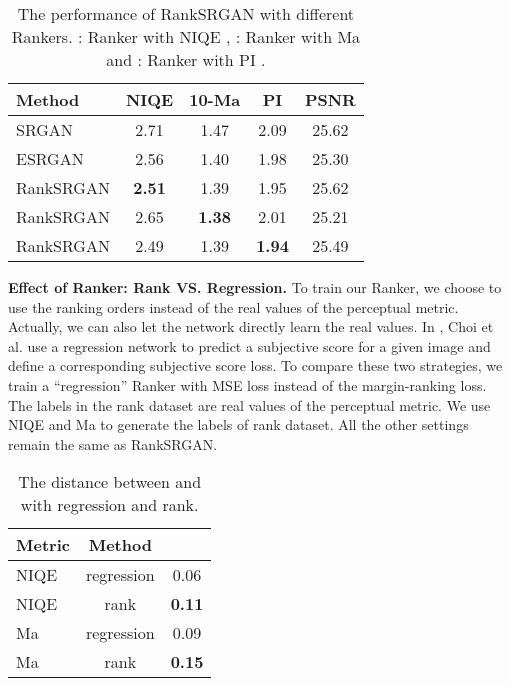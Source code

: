 \documentclass[10pt,twocolumn,letterpaper]{article}
\begin{document}
\begin{table}[h]
\begin{center}
\small \setlength{\abovecaptionskip}{-0.3cm}
\setlength{\belowcaptionskip}{-0.4cm}
\begin{tabular}{l|cccc}
\hline\hline
Method &NIQE&10-Ma&PI&PSNR \\
\hline
SRGAN&2.71&1.47&2.09&25.62\\
ESRGAN&2.56&1.40&1.98&25.30\\
\hline
RankSRGAN&\textbf{2.51}&1.39&1.95&25.62\\
RankSRGAN&2.65&\textbf{1.38}&2.01&25.21\\
RankSRGAN&2.49&1.39&\textbf{1.94}&25.49\\
\hline
\end{tabular}
\end{center}
\caption{The performance of RankSRGAN with different Rankers. : Ranker with NIQE \cite{mittal2013making}, : Ranker with Ma \cite{ma2017learning} and : Ranker with PI \cite{blau20182018}.}
\label{table:RankSRGAN-metric}
\end{table}
\vskip -0.3cm

\textbf{Effect of Ranker: Rank VS. Regression.} To train our Ranker, we choose to use the ranking orders instead of the real values of the perceptual metric. Actually, we can also let the network directly learn the real values. In \cite{choi2018deep}, Choi et al. use a regression network to predict a subjective score for a given image and define a corresponding subjective score loss. To compare these two strategies, we train a ``regression'' Ranker with MSE loss instead of the margin-ranking loss. The labels in the rank dataset are real values of the perceptual metric. We use NIQE and Ma to generate the labels of rank dataset. All the other settings remain the same as RankSRGAN. 
\begin{table}[h]
\small \setlength{\abovecaptionskip}{-0.2cm} 
\setlength{\belowcaptionskip}{-0.4cm}
\begin{center}
\begin{tabular}{l|c c}
\hline\hline
Metric&Method&\\
\hline
NIQE&regression&0.06\\
NIQE&rank&\textbf{0.11}\\
\hline
Ma&regression&0.09\\
Ma&rank&\textbf{0.15}\\
\hline
\end{tabular}
\end{center}
\caption{The distance between  and  with regression and rank.}
\label{table:Ranker-distance}
\end{table}
\end{document}
